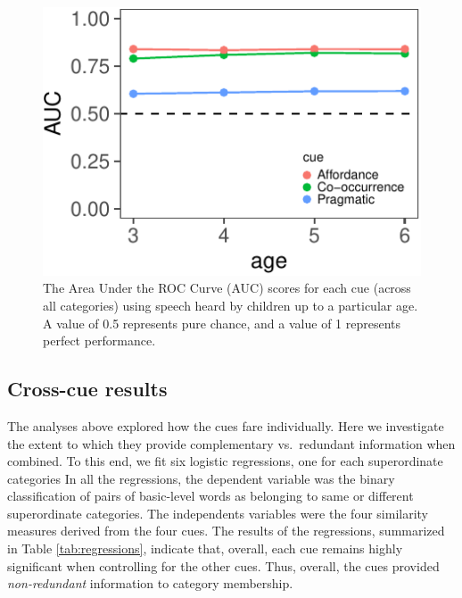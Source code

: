 \documentclass[english,,man]{apa6}
\begin{document}
\begin{figure}[!htbp]

{\centering \includegraphics{child_language_journal_files/figure-latex/dev-1} 

}

\caption{\label{fig:dev} The Area Under the ROC Curve (AUC) scores for each cue (across all categories) using speech heard by children up to a particular age. A value of 0.5 represents pure chance, and a value of 1 represents perfect performance.}\label{fig:dev}
\end{figure}

\hypertarget{cross-cue-results}{%
\subsection{Cross-cue results}\label{cross-cue-results}}

The analyses above explored how the cues fare individually. Here we investigate the extent to which they provide complementary vs.~redundant information when combined. To this end, we fit six logistic regressions, one for each superordinate categories In all the regressions, the dependent variable was the binary classification of pairs of basic-level words as belonging to same or different superordinate categories. The independents variables were the four similarity measures derived from the four cues. The results of the regressions,
summarized in Table \ref{tab:regressions}, indicate that, overall, each cue remains highly significant when controlling for the other cues. Thus, overall, the cues provided \emph{non-redundant} information to category membership.
\end{document}
